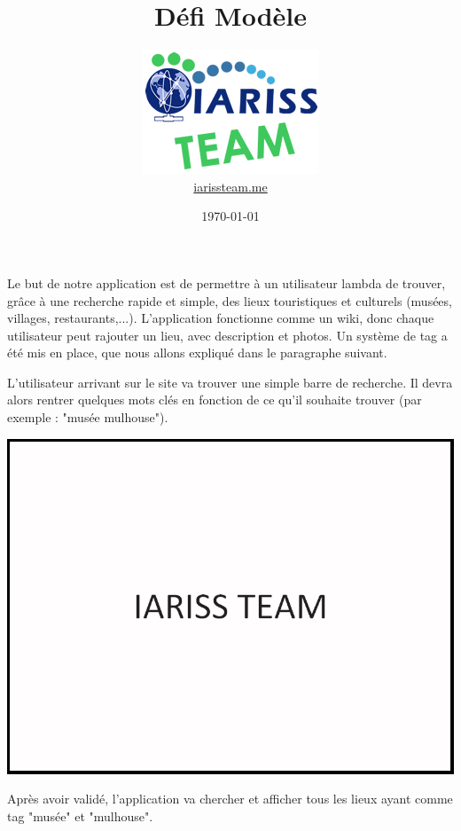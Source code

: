 \documentclass[12pt, a4paper]{article}
\title{Défi Modèle}
\newcommand{\espace}{\vspace{.8cm}}
\begin{document}
\author{\includegraphics{../_img/iariss_team.png} \\ {\sffamily \href{http://iarissteam.me}{iarissteam.me}}}
\date{\today}


{\sffamily Le but de notre application est de permettre à un utilisateur lambda de trouver, grâce à une recherche rapide et simple, des lieux touristiques et culturels (musées, villages, restaurants,...). L'application fonctionne comme un wiki, donc chaque utilisateur peut rajouter un lieu, avec description et photos. Un système de tag a été mis en place, que nous allons expliqué dans le paragraphe suivant.} 

\espace{}
L'utilisateur arrivant sur le site va trouver une simple barre de recherche. Il devra alors rentrer quelques mots clés en fonction de ce qu'il souhaite trouver (par exemple : "musée mulhouse").

\espace{}
\includegraphics{img/test.png}

\espace{}
Après avoir validé, l'application va chercher et afficher tous les lieux ayant comme tag "musée" et "mulhouse".
\end{document}
